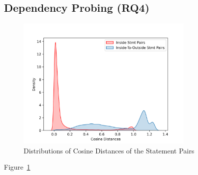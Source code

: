 \subsection{Dependency Probing (RQ4)}
\label{sec:rq4}

\begin{figure}[t]
 	\centering
 	\includegraphics[width=3.4in]{rq4-density.png}
        \vspace{-20pt}
 	\caption{Distributions of Cosine Distances of the Statement Pairs}
 	\label{fig:rq4-density}	
\end{figure}

Figure~\ref{fig:rq4-density}